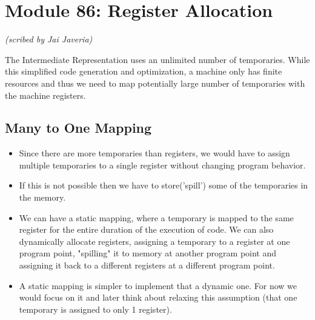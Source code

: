 \section{Module 86: Register Allocation}
\begin{flushright}
\textit{(scribed by Jai Javeria)}
\end{flushright}
The Intermediate Representation uses an unlimited number of temporaries. While this simplified code generation and optimization, a machine only has  finite resources and thus we need to map potentially large number of temporaries with the machine registers.

\subsection{Many to One Mapping}
\begin{itemize}
    \item Since there are more temporaries than registers, we would have to assign multiple temporaries to a single register without changing program behavior. 
    \item If this is not possible then we have to store('spill') some of the temporaries in the memory.
    \item We can have a static mapping, where a temporary is mapped to the same register for the entire duration of the execution of code. We can also dynamically allocate registers, assigning a temporary to a register at one program point, "spilling" it to memory at another program point and assigning it back to a different registers at a different program point.
    \item A static mapping is simpler to implement that a dynamic one. For now we would focus on it and later think about relaxing this assumption (that one temporary is assigned to only 1 register).
\end{itemize}
